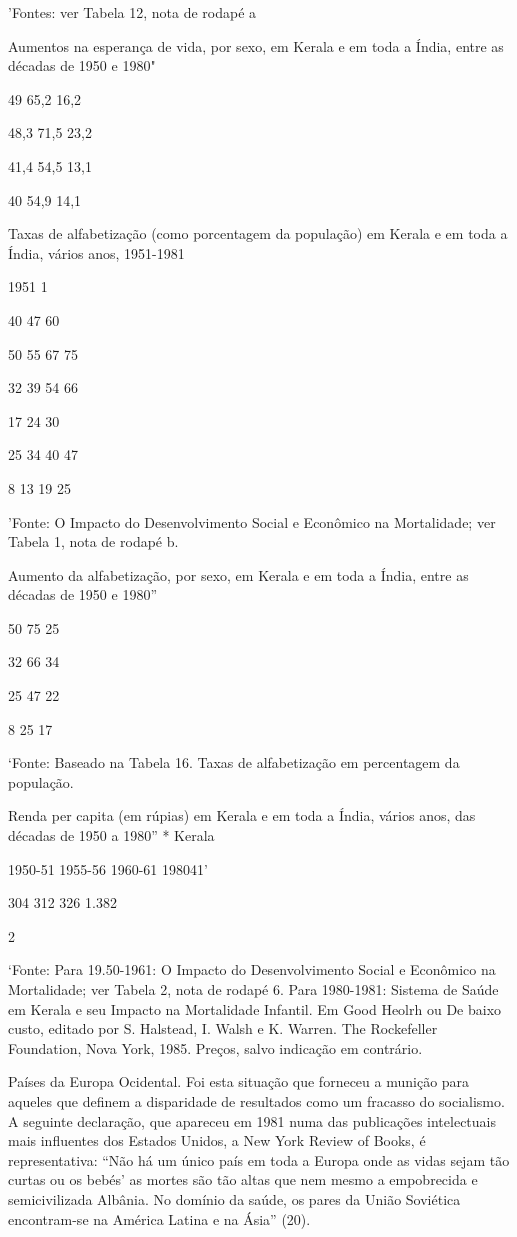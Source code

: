 \documentclass[twocolumn,amsmath,amssymb,aps,pre,floatfix]{revtex4-2}
\begin{document}
\par
'Fontes: ver Tabela 12, nota de rodapé a
\par
Aumentos na esperança de vida, por sexo, em Kerala e em toda a Índia, entre as décadas de 1950 e 1980"
\par
49 65,2 16,2
\par
48,3 71,5 23,2
\par
41,4 54,5 13,1
\par
40 54,9 14,1
\par
Taxas de alfabetização (como porcentagem da população) em Kerala e em toda a Índia, vários anos, 1951-1981
\par
1951 1%
\par
40 47 60
\par
50 55 67 75
\par
32 39 54 66
\par
17 24 30
\par
25 34 40 47
\par
8 13 19 25
\par
'Fonte: O Impacto do Desenvolvimento Social e Econômico na Mortalidade; ver Tabela 1, nota de rodapé b.
\par
Aumento da alfabetização, por sexo, em Kerala e em toda a Índia, entre as décadas de 1950 e 1980”
\par
50 75 25
\par
32 66 34
\par
25 47 22
\par
8 25 17
\par
‘Fonte: Baseado na Tabela 16. Taxas de alfabetização em percentagem da população.
\par
Renda per capita (em rúpias) em Kerala e em toda a Índia, vários anos, das décadas de 1950 a 1980'' * Kerala
\par
1950-51 1955-56 1960-61 198041'
\par
304 312 326 1.382
\par
2%
\par
‘Fonte: Para 19.50-1961: O Impacto do Desenvolvimento Social e Econômico na Mortalidade; ver Tabela 2, nota de rodapé 6. Para 1980-1981: Sistema de Saúde em Kerala e seu Impacto na Mortalidade Infantil. Em Good Heolrh ou De baixo custo, editado por S. Halstead, I. Walsh e K. Warren. The Rockefeller Foundation, Nova York, 1985. Preços, salvo indicação em contrário.
\par
\par
Países da Europa Ocidental. Foi esta situação que forneceu a munição para aqueles que definem a disparidade de resultados como um fracasso do socialismo. A seguinte declaração, que apareceu em 1981 numa das publicações intelectuais mais influentes dos Estados Unidos, a New York Review of Books, é representativa: “Não há um único país em toda a Europa onde as vidas sejam tão curtas ou os bebés' as mortes são tão altas que nem mesmo a empobrecida e semicivilizada Albânia. No domínio da saúde, os pares da União Soviética encontram-se na América Latina e na Ásia” (20).
\end{document}
